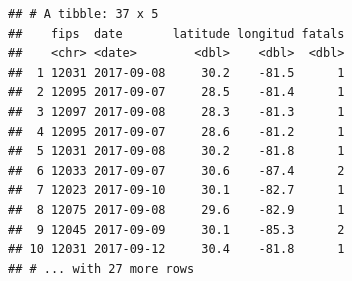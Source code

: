 \documentclass[]{tufte-book}
\newenvironment{Shaded}{}{}
\newcommand{\DataTypeTok}[1]{\textcolor[rgb]{0.56,0.13,0.00}{#1}}
\newcommand{\DecValTok}[1]{\textcolor[rgb]{0.25,0.63,0.44}{#1}}
\newcommand{\KeywordTok}[1]{\textcolor[rgb]{0.00,0.44,0.13}{\textbf{#1}}}
\newcommand{\NormalTok}[1]{#1}
\newcommand{\OperatorTok}[1]{\textcolor[rgb]{0.40,0.40,0.40}{#1}}
\newcommand{\StringTok}[1]{\textcolor[rgb]{0.25,0.44,0.63}{#1}}
\begin{document}
\begin{Shaded}
\end{Shaded}

\begin{verbatim}
## # A tibble: 37 x 5
##    fips  date       latitude longitud fatals
##    <chr> <date>        <dbl>    <dbl>  <dbl>
##  1 12031 2017-09-08     30.2    -81.5      1
##  2 12095 2017-09-07     28.5    -81.4      1
##  3 12097 2017-09-08     28.3    -81.3      1
##  4 12095 2017-09-07     28.6    -81.2      1
##  5 12031 2017-09-08     30.2    -81.8      1
##  6 12033 2017-09-07     30.6    -87.4      2
##  7 12023 2017-09-10     30.1    -82.7      1
##  8 12075 2017-09-08     29.6    -82.9      1
##  9 12045 2017-09-09     30.1    -85.3      2
## 10 12031 2017-09-12     30.4    -81.8      1
## # ... with 27 more rows
\end{verbatim}
\end{document}
